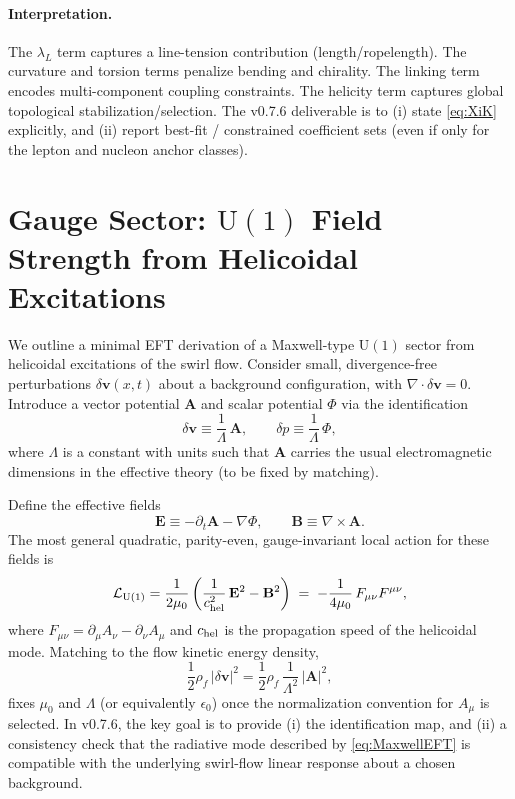 \documentclass[10pt]{article}
\begin{document}
\paragraph{Interpretation.}
The $\lambda_L$ term captures a line-tension contribution (length/ropelength). The curvature and torsion terms
penalize bending and chirality. The linking term encodes multi-component coupling constraints. The helicity term
captures global topological stabilization/selection. The v0.7.6 deliverable is to (i) state \eqref{eq:XiK} explicitly,
and (ii) report best-fit / constrained coefficient sets (even if only for the lepton and nucleon anchor classes).


\section{Gauge Sector: $\mathrm{U}(1)$ Field Strength from Helicoidal Excitations}
\label{sec:v076-u1}

We outline a minimal EFT derivation of a Maxwell-type $\mathrm{U}(1)$ sector from helicoidal excitations of the
swirl flow. Consider small, divergence-free perturbations $\delta\mathbf{v}(x,t)$ about a background configuration,
with $\nabla\cdot\delta\mathbf{v}=0$. Introduce a vector potential $\mathbf{A}$ and scalar potential $\Phi$ via the
identification
\begin{equation}
\delta\mathbf{v} \equiv \frac{1}{\Lambda}\,\mathbf{A},
\qquad
\delta p \equiv \frac{1}{\Lambda}\,\Phi,
\end{equation}
where $\Lambda$ is a constant with units such that $\mathbf{A}$ carries the usual electromagnetic dimensions in the
effective theory (to be fixed by matching).

Define the effective fields
\begin{equation}
\mathbf{E} \equiv -\partial_t \mathbf{A}-\nabla\Phi,
\qquad
\mathbf{B} \equiv \nabla\times\mathbf{A}.
\end{equation}
The most general quadratic, parity-even, gauge-invariant local action for these fields is
\begin{equation}
\mathcal{L}_{\mathrm{U}(1)}=\frac{1}{2\mu_0}\left(\frac{1}{c_{\rm hel}^2}\,\mathbf{E}^2-\mathbf{B}^2\right)
\;=\;-\frac{1}{4\mu_0}\,F_{\mu\nu}F^{\mu\nu},
\label{eq:MaxwellEFT}
\end{equation}
where $F_{\mu\nu}=\partial_\mu A_\nu-\partial_\nu A_\mu$ and $c_{\rm hel}$ is the propagation speed of the helicoidal
mode. Matching to the flow kinetic energy density,
\begin{equation}
\frac{1}{2}\rho_{\!f}\,|\delta\mathbf{v}|^2 = \frac{1}{2}\rho_{\!f}\,\frac{1}{\Lambda^2}\,|\mathbf{A}|^2,
\end{equation}
fixes $\mu_0$ and $\Lambda$ (or equivalently $\epsilon_0$) once the normalization convention for $A_\mu$ is selected.
In v0.7.6, the key goal is to provide (i) the identification map, and (ii) a consistency check that the radiative mode
described by \eqref{eq:MaxwellEFT} is compatible with the underlying swirl-flow linear response about a chosen background.
\end{document}
